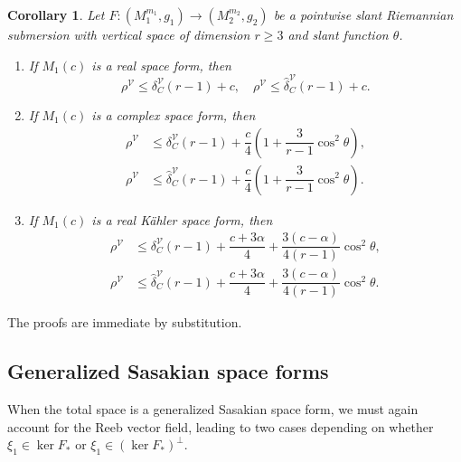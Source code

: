 \documentclass[11pt]{amsart}
\theoremstyle{plain}
\newtheorem{corollary}{Corollary}[section]
\theoremstyle{definition}
\theoremstyle{remark}
\newcommand{\calV}{\mathcal{V}}
\begin{document}
\begin{corollary}\label{cor:subm_vert_real}
Let $F:(M_1^{m_1},g_1)\to (M_2^{m_2},g_2)$ be a pointwise slant Riemannian submersion with vertical space of dimension $r\ge 3$ and slant function $\theta$.
\begin{enumerate}
    \item If $M_1(c)$ is a real space form, then
    \begin{equation}\label{eq:subm_vert_real}
    \rho^{\calV} \le \delta_C^{\calV}(r-1) + c, \quad \rho^{\calV} \le \hat{\delta}_C^{\calV}(r-1) + c.
    \end{equation}
    
    \item If $M_1(c)$ is a complex space form, then
    \begin{align}
    \rho^{\calV} &\le \delta_C^{\calV}(r-1) + \dfrac{c}{4}\left(1 + \dfrac{3}{r-1}\cos^2\theta\right), \label{eq:subm_vert_complex}\\
    \rho^{\calV} &\le \hat{\delta}_C^{\calV}(r-1) + \dfrac{c}{4}\left(1 + \dfrac{3}{r-1}\cos^2\theta\right).
    \end{align}
    
    \item If $M_1(c)$ is a real K\"{a}hler space form, then
    \begin{align}
    \rho^{\calV} &\le \delta_C^{\calV}(r-1) + \dfrac{c+3\alpha}{4} + \dfrac{3(c-\alpha)}{4(r-1)}\cos^2\theta, \label{eq:subm_vert_kahler}\\
    \rho^{\calV} &\le \hat{\delta}_C^{\calV}(r-1) + \dfrac{c+3\alpha}{4} + \dfrac{3(c-\alpha)}{4(r-1)}\cos^2\theta.
    \end{align}
\end{enumerate}
\end{corollary}

The proofs are immediate by substitution.\\ 

\subsection{Generalized Sasakian space forms}

When the total space is a generalized Sasakian space form, we must again account for the Reeb vector field, leading to two cases depending on whether $\xi_1 \in \ker F_*$ or $\xi_1 \in (\ker F_*)^\perp$.
\end{document}
